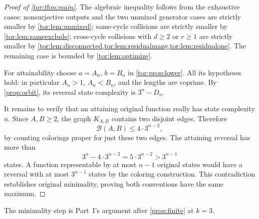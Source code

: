 \documentclass[11pt,a4paper]{article}
\numberwithin{equation}{section}
\theoremstyle{definition}
\theoremstyle{remark}
\newcommand{\Bip}{\mathcal B}
\begin{document}
\begin{proof}[Proof of \cref{tor:thm:main}]
The algebraic inequality follows from the exhaustive cases: nonsurjective
outputs and the two unmixed generator cases are strictly smaller by
\cref{tor:lem:unmixed}; same-cycle collisions are strictly smaller by
\cref{tor:lem:sameexclude}; cross-cycle collisions with $d\ge2$ or $r\ge1$ are
strictly smaller by
\cref{tor:lem:disconnected,tor:lem:residualmany,tor:lem:residualone}. The
remaining case is bounded by \cref{tor:lem:optimize}.

For attainability choose $a=A_n$, $b=B_n$ in \cref{tor:prop:lower}. All its
hypotheses hold: in particular $A_n>1$, $A_n<B_n$, and the lengths are
coprime. By \cref{prop:orbit}, its reversal state complexity is $3^n-D_n$.

It remains to verify that an attaining original function really has state
complexity $n$. Since $A,B\ge2$, the graph $K_{A,B}$ contains two disjoint
edges. Therefore
\[
 \Bip(A,B)\le4\cdot3^{n-2},
\]
by counting colorings proper for just these two edges. The attaining reversal
has more than
\[
 3^n-4\cdot3^{n-2}=5\cdot3^{n-2}>3^{n-1}
\]
states. A function representable by at most $n-1$ original states would have
a reversal with at most $3^{n-1}$ states by the coloring construction. This
contradiction establishes original minimality, proving both conventions have
the same maximum.
\end{proof}

The minimality step is Part~I's argument after \cref{prop:finite} at $k=3$.
\end{document}
